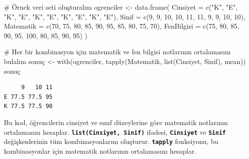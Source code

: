 \documentclass[
  letterpaper,
  DIV=11,
  numbers=noendperiod]{scrreprt}
\newenvironment{Shaded}{\begin{snugshade}}{\end{snugshade}}
\newcommand{\AttributeTok}[1]{\textcolor[rgb]{0.40,0.45,0.13}{#1}}
\newcommand{\CommentTok}[1]{\textcolor[rgb]{0.37,0.37,0.37}{#1}}
\newcommand{\DecValTok}[1]{\textcolor[rgb]{0.68,0.00,0.00}{#1}}
\newcommand{\FunctionTok}[1]{\textcolor[rgb]{0.28,0.35,0.67}{#1}}
\newcommand{\NormalTok}[1]{\textcolor[rgb]{0.00,0.23,0.31}{#1}}
\newcommand{\OtherTok}[1]{\textcolor[rgb]{0.00,0.23,0.31}{#1}}
\newcommand{\StringTok}[1]{\textcolor[rgb]{0.13,0.47,0.30}{#1}}
\begin{document}
\begin{Shaded}
\begin{Highlighting}[]
\CommentTok{\# Örnek veri seti oluşturalım}
\NormalTok{ogrenciler }\OtherTok{\textless{}{-}} \FunctionTok{data.frame}\NormalTok{(}
  \AttributeTok{Cinsiyet =} \FunctionTok{c}\NormalTok{(}\StringTok{"K"}\NormalTok{, }\StringTok{"E"}\NormalTok{, }\StringTok{"K"}\NormalTok{, }\StringTok{"E"}\NormalTok{, }\StringTok{"K"}\NormalTok{, }\StringTok{"E"}\NormalTok{, }\StringTok{"K"}\NormalTok{, }\StringTok{"E"}\NormalTok{, }\StringTok{"K"}\NormalTok{, }\StringTok{"E"}\NormalTok{),}
  \AttributeTok{Sinif =} \FunctionTok{c}\NormalTok{(}\DecValTok{9}\NormalTok{, }\DecValTok{9}\NormalTok{, }\DecValTok{10}\NormalTok{, }\DecValTok{10}\NormalTok{, }\DecValTok{11}\NormalTok{, }\DecValTok{11}\NormalTok{, }\DecValTok{9}\NormalTok{, }\DecValTok{9}\NormalTok{, }\DecValTok{10}\NormalTok{, }\DecValTok{10}\NormalTok{),}
  \AttributeTok{Matematik =} \FunctionTok{c}\NormalTok{(}\DecValTok{70}\NormalTok{, }\DecValTok{75}\NormalTok{, }\DecValTok{80}\NormalTok{, }\DecValTok{85}\NormalTok{, }\DecValTok{90}\NormalTok{, }\DecValTok{95}\NormalTok{, }\DecValTok{85}\NormalTok{, }\DecValTok{80}\NormalTok{, }\DecValTok{75}\NormalTok{, }\DecValTok{70}\NormalTok{),}
  \AttributeTok{FenBilgisi =} \FunctionTok{c}\NormalTok{(}\DecValTok{75}\NormalTok{, }\DecValTok{80}\NormalTok{, }\DecValTok{85}\NormalTok{, }\DecValTok{90}\NormalTok{, }\DecValTok{95}\NormalTok{, }\DecValTok{100}\NormalTok{, }\DecValTok{80}\NormalTok{, }\DecValTok{85}\NormalTok{, }\DecValTok{90}\NormalTok{, }\DecValTok{95}\NormalTok{)}
\NormalTok{)}

\CommentTok{\# Her bir kombinasyon için matematik ve fen bilgisi notlarının ortalamasını bulalım}
\NormalTok{sonuç }\OtherTok{\textless{}{-}} \FunctionTok{with}\NormalTok{(ogrenciler, }\FunctionTok{tapply}\NormalTok{(Matematik, }\FunctionTok{list}\NormalTok{(Cinsiyet, Sinif), mean))}
\NormalTok{sonuç}
\end{Highlighting}
\end{Shaded}

\begin{verbatim}
     9   10 11
E 77.5 77.5 95
K 77.5 77.5 90
\end{verbatim}

Bu kod, öğrencilerin cinsiyet ve sınıf düzeylerine göre matematik
notlarının ortalamasını hesaplar.
\textbf{\texttt{list(Cinsiyet,\ Sinif)}} ifadesi,
\textbf{\texttt{Cinsiyet}} ve \textbf{\texttt{Sinif}} değişkenlerinin
tüm kombinasyonlarını oluşturur. \textbf{\texttt{tapply}} fonksiyonu, bu
kombinasyonlar için matematik notlarının ortalamasını hesaplar.
\end{document}
